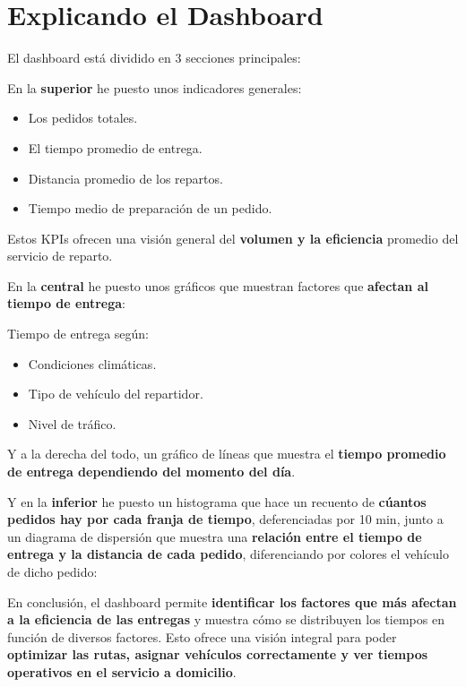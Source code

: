 \documentclass{../../../miPlantilla}
\begin{document}
\maketitle

\section{Explicando el Dashboard}

El dashboard está dividido en 3 secciones principales:

En la \textbf{superior} he puesto unos indicadores generales:


\begin{itemize}
  \item Los pedidos totales.
  \item El tiempo promedio de entrega.
  \item Distancia promedio de los repartos.
  \item Tiempo medio de preparación de un pedido.
\end{itemize}

Estos KPIs ofrecen una visión general del \textbf{volumen y la eficiencia} promedio del servicio de reparto.

En la \textbf{central} he puesto unos gráficos que muestran factores que \textbf{afectan al tiempo de entrega}:


Tiempo de entrega según:

\begin{itemize}
  \item Condiciones climáticas.
  \item Tipo de vehículo del repartidor.
  \item Nivel de tráfico.
\end{itemize}

Y a la derecha del todo, un gráfico de líneas que muestra el \textbf{tiempo promedio de entrega dependiendo del momento del día}.

Y en la \textbf{inferior} he puesto un histograma que hace un recuento de \textbf{cúantos pedidos hay por cada franja de tiempo},
deferenciadas por 10 min, junto a un diagrama de dispersión que muestra una \textbf{relación entre el tiempo de entrega y la distancia de
cada pedido}, diferenciando por colores el vehículo de dicho pedido:


En conclusión, el dashboard permite \textbf{identificar los factores que más afectan a la eficiencia de las entregas} y muestra
cómo se distribuyen los tiempos en función de diversos factores. Esto ofrece una visión integral para poder \textbf{optimizar
las rutas, asignar vehículos correctamente y ver tiempos operativos en el servicio a domicilio}.
\end{document}
